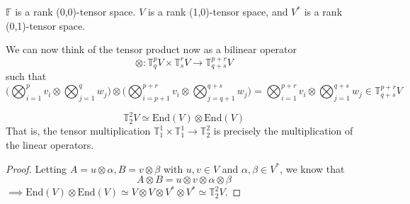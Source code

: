   \begin{example}
    $\mathbb{F}$ is a rank (0,0)-tensor space. $V$ is a rank (1,0)-tensor space, and $V^{*}$ is a rank (0,1)-tensor space. 
  \end{example}

  We can now think of the tensor product now as a bilinear operator
  \[\otimes: \mathbb{T}^p_q V \times \mathbb{T}^r_s V \longrightarrow \mathbb{T}^{p+r}_{q+s} V\]
  such that
  \[\bigg( \bigotimes_{i=1}^p v_i \otimes \bigotimes_{j=1}^q w_j \bigg) \otimes \bigg( \bigotimes_{i = p+1}^{p+r} v_i \otimes \bigotimes_{j=q+1}^{q+s} w_j \bigg) = \bigotimes_{i=1}^{p+r} v_i \otimes \bigotimes_{j=1}^{q+s} w_j \in \mathbb{T}^{p+r}_{q+s} V\]

  \begin{theorem}
    \[\mathbb{T}^2_2 V \simeq \text{End}(V) \otimes \text{End}(V)\]
    That is, the tensor multiplication $\mathbb{T}^1_1 \times \mathbb{T}^1_1 \longrightarrow \mathbb{T}^2_2$ is precisely the multiplication of the linear operators. 
  \end{theorem}
  \begin{proof}
    Letting $A = u \otimes \alpha, B = v \otimes \beta$ with $u, v \in V$ and $\alpha, \beta \in V^*$, we know that
    \[A \otimes B = u \otimes v \otimes \alpha \otimes \beta\]
    $\implies \text{End}(V) \otimes \text{End}(V) \simeq V \otimes V \otimes V^* \otimes V^* \simeq \mathbb{T}^2_2 V$. 
  \end{proof}

